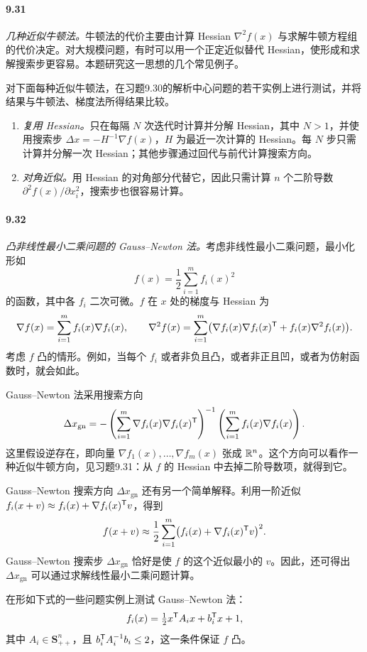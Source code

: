 \paragraph{9.31} \emph{几种近似牛顿法。}牛顿法的代价主要由计算 Hessian $\nabla^2f(x)$ 与求解牛顿方程组的代价决定。对大规模问题，有时可以用一个正定近似替代 Hessian，使形成和求解搜索步更容易。本题研究这一思想的几个常见例子。

对下面每种近似牛顿法，在习题9.30的解析中心问题的若干实例上进行测试，并将结果与牛顿法、梯度法所得结果比较。
\begin{enumerate}[label=(\alph*)]
\item \emph{复用 Hessian。}只在每隔 $N$ 次迭代时计算并分解 Hessian，其中 $N>1$，并使用搜索步 $\Delta x=-H^{-1}\nabla f(x)$，$H$ 为最近一次计算的 Hessian。每 $N$ 步只需计算并分解一次 Hessian；其他步骤通过回代与前代计算搜索方向。
\item \emph{对角近似。}用 Hessian 的对角部分代替它，因此只需计算 $n$ 个二阶导数 $\partial^2f(x)/\partial x_i^2$，搜索步也很容易计算。
\end{enumerate}

\paragraph{9.32} \emph{凸非线性最小二乘问题的 Gauss--Newton 法。}考虑非线性最小二乘问题，最小化形如
\[
 f(x)=\frac12\sum_{i=1}^m f_i(x)^2
\]
的函数，其中各 $f_i$ 二次可微。$f$ 在 $x$ 处的梯度与 Hessian 为
\[
 \nabla f(x)=\sum_{i=1}^m f_i(x)\nabla f_i(x),\qquad
 \nabla^2f(x)=\sum_{i=1}^m\bigl(\nabla f_i(x)\nabla f_i(x)^\mathsf T+f_i(x)\nabla^2f_i(x)\bigr).
\]
考虑 $f$ 凸的情形。例如，当每个 $f_i$ 或者非负且凸，或者非正且凹，或者为仿射函数时，就会如此。

Gauss--Newton 法采用搜索方向
\[
 \Delta x_{\mathrm{gn}}=-\left(\sum_{i=1}^m\nabla f_i(x)\nabla f_i(x)^\mathsf T\right)^{-1}
 \left(\sum_{i=1}^m f_i(x)\nabla f_i(x)\right).
\]
这里假设逆存在，即向量 $\nabla f_1(x),\ldots,\nabla f_m(x)$ 张成 $\mathbb R^n$。这个方向可以看作一种近似牛顿方向，见习题9.31：从 $f$ 的 Hessian 中去掉二阶导数项，就得到它。

Gauss--Newton 搜索方向 $\Delta x_{\mathrm{gn}}$ 还有另一个简单解释。利用一阶近似 $f_i(x+v)\approx f_i(x)+\nabla f_i(x)^\mathsf T v$，得到
\[
 f(x+v)\approx\frac12\sum_{i=1}^m\bigl(f_i(x)+\nabla f_i(x)^\mathsf T v\bigr)^2.
\]
Gauss--Newton 搜索步 $\Delta x_{\mathrm{gn}}$ 恰好是使 $f$ 的这个近似最小的 $v$。因此，还可得出 $\Delta x_{\mathrm{gn}}$ 可以通过求解线性最小二乘问题计算。

在形如下式的一些问题实例上测试 Gauss--Newton 法：
\[
 f_i(x)=\tfrac12x^\mathsf T A_ix+b_i^\mathsf T x+1,
\]
其中 $A_i\in\mathbf S_{++}^n$，且 $b_i^\mathsf T A_i^{-1}b_i\le2$，这一条件保证 $f$ 凸。
